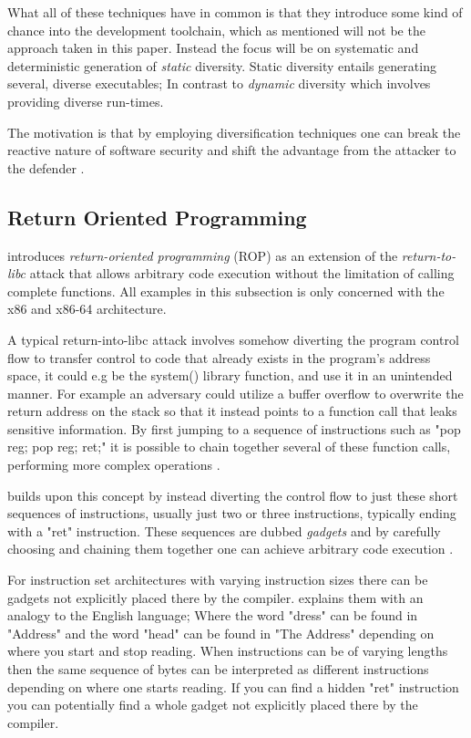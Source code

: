 What all of these techniques have in common is that they introduce some kind of chance into
the development toolchain, which as mentioned will not be the approach taken in this paper.
Instead the focus will be on systematic and deterministic generation of \textit{static}
diversity.  Static diversity entails generating several, diverse executables; In contrast
to \textit{dynamic} diversity which involves providing diverse run-times\cite{survey}.

The motivation is that by employing diversification techniques one can break the
reactive nature of software security and shift the advantage from the attacker to the
defender \cite{compiler-generated-sw-div}.

\subsection{Return Oriented Programming}
\label{rop}

\textcite{rop} introduces \textit{return-oriented programming} (ROP) as an extension of
the \textit{return-to-libc}\cite{return-into-libc} attack that allows arbitrary code
execution without the limitation of calling complete functions. All examples in this
subsection is only concerned with the x86 and x86-64 architecture.

A typical return-into-libc attack involves somehow diverting the program control
flow to transfer control to code that already exists in the program's address space,
it could e.g be the system() library function, and use it in an unintended manner. For
example an adversary could utilize a buffer overflow to overwrite the return address on
the stack so that it instead points to a function call that leaks sensitive information.
By first jumping to a sequence of instructions such as "pop reg; pop reg; ret;" it is
possible to chain together several of these function calls, performing more complex
operations \cite{non-exec-stack,advanced-return-into-libc}.

\textcite{rop} builds upon this concept by instead diverting the control flow to just these
short sequences of instructions, usually just two or three instructions, typically ending
with a "ret" instruction. These sequences are dubbed \textit{gadgets} and by carefully
choosing and chaining them together one can achieve arbitrary code execution \cite{rop}.

For instruction set architectures with varying instruction sizes there can be gadgets not
explicitly placed there by the compiler. \textcite{rop} explains them with an analogy to
the English language; Where the word "dress" can be found in "Address" and the word "head"
can be found in "The Address" depending on where you start and stop reading. When
instructions can be of varying lengths then the same sequence of bytes can be interpreted
as different instructions depending on where one starts reading. If you can find a hidden
"ret" instruction you can potentially find a whole gadget not explicitly placed there by
the compiler.


